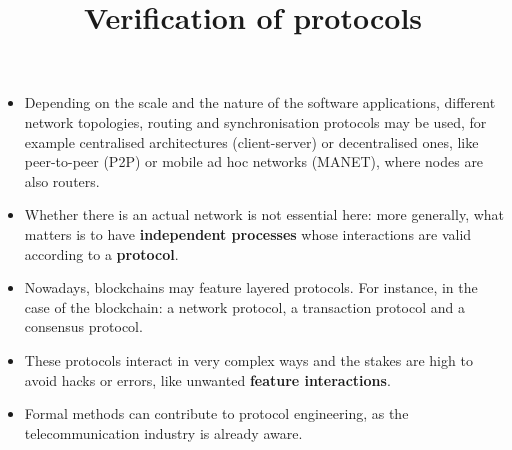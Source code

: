 \documentclass[wide]{slides}
\begin{document}
\begin{slide}
  \title{Verification of protocols}

  \begin{itemize}

    \item Depending on the scale and the nature of the software
      applications, different network topologies, routing and
      synchronisation protocols may be used, for example centralised
      architectures (client\hyp{}server) or decentralised ones, like
      peer\hyp{}to\hyp{}peer (P2P) or mobile ad hoc networks (MANET),
      where nodes are also routers.

    \item Whether there is an actual network is not essential here:
      more generally, what matters is to have \textbf{independent
        processes} whose interactions are valid according to a
      \textbf{protocol}.

    \item Nowadays, blockchains may feature layered protocols. For
      instance, in the case of the \Tezos blockchain: a network
      protocol, a transaction protocol and a consensus protocol.

    \item These protocols interact in very complex ways and the stakes
      are high to avoid hacks or errors, like unwanted \textbf{feature
        interactions}.

    \item Formal methods can contribute to protocol engineering, as
      the telecommunication industry is already aware.

  \end{itemize}

\end{slide}
\end{document}
